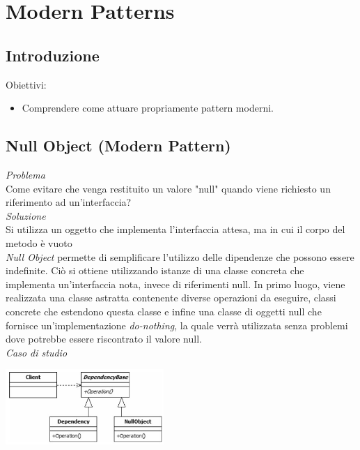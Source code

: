 \documentclass{article}
\begin{document}
\pagestyle{empty}
\section*{Modern Patterns}
\large

\subsection*{Introduzione}
\large
Obiettivi:
\begin{itemize}
    \renewcommand{\labelitemi}{-}
    \itemsep0em
    \item Comprendere come attuare propriamente pattern moderni.
\end{itemize}

\subsection*{Null Object (Modern Pattern)}
\large
\textit{Problema}\\
Come evitare che venga restituito un valore "null" quando viene richiesto un riferimento ad un'interfaccia?\vspace*{14pt}\\
\textit{Soluzione}\\
Si utilizza un oggetto che implementa l’interfaccia attesa, ma in cui il corpo del metodo è vuoto\vspace*{14pt}\\
\textit{Null Object} permette di semplificare l'utilizzo delle dipendenze che possono essere indefinite. Ciò si ottiene utilizzando istanze di una classe concreta che implementa un'interfaccia nota, invece di riferimenti null. In primo luogo, viene realizzata una classe astratta contenente diverse operazioni da eseguire, classi concrete che estendono questa classe e infine una classe di oggetti null che fornisce un'implementazione \textit{do-nothing}, la quale verrà utilizzata senza problemi dove potrebbe essere riscontrato il valore null.\vspace*{14pt}\\
\textit{Caso di studio}\\
\begin{center}
    \includegraphics[width=0.45\textwidth]{foto 1.png}
\end{center}
\end{document}
